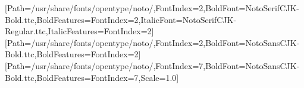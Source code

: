 \setmainfont{NotoSerifCJK-Regular.ttc}[Path={/usr/share/fonts/opentype/noto/},FontIndex=2,BoldFont={NotoSerifCJK-Bold.ttc},BoldFeatures={FontIndex=2},ItalicFont={NotoSerifCJK-Regular.ttc},ItalicFeatures={FontIndex=2}]
\setsansfont{NotoSansCJK-Regular.ttc}[Path={/usr/share/fonts/opentype/noto/},FontIndex=2,BoldFont={NotoSansCJK-Bold.ttc},BoldFeatures={FontIndex=2}]
\setmonofont{NotoSansCJK-Regular.ttc}[Path={/usr/share/fonts/opentype/noto/},FontIndex=7,BoldFont={NotoSansCJK-Bold.ttc},BoldFeatures={FontIndex=7},Scale=1.0]
